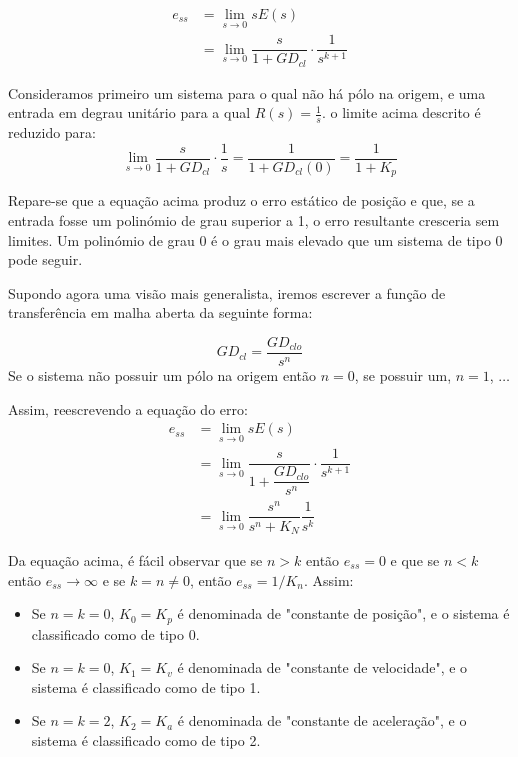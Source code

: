 $$
    \begin{aligned}
        e_{ss} &= \lim_{s \to 0} s E(s)\\
        &= \lim_{s \to 0} \dfrac{s}{1 + GD_{cl}} \cdot \dfrac{1}{s^{k + 1}}
    \end{aligned}
$$

\noindent Consideramos primeiro um sistema para o qual não há pólo na origem, e uma entrada em degrau unitário para a qual $R(s) = \frac{1}{s}$. o limite acima descrito é reduzido para:
$$
    \lim_{s \to 0} \dfrac{s}{1 + GD_{cl}} \cdot \dfrac{1}{s} = \dfrac{1}{1 + GD_{cl}(0)} = \dfrac{1}{1 + K_p}
$$

\noindent Repare-se que a equação acima produz o erro estático de posição e que, se a entrada fosse um polinómio de grau superior a 1, o erro resultante cresceria sem limites. Um polinómio de grau 0 é o grau mais elevado que um sistema de tipo 0 pode seguir.

\vspace{1 em}
\noindent Supondo agora uma visão mais generalista, iremos escrever a função de transferência em malha aberta da seguinte forma:

$$
    GD_{cl} = \dfrac{GD_{clo}}{s^n}
$$
\noindent Se o sistema não possuir um pólo na origem então $n = 0$, se possuir um, $n = 1$, $\dots$

\noindent Assim, reescrevendo a equação do erro:
$$
    \begin{aligned}
        e_{ss} &= \lim_{s \to 0} s E(s)\\
        &= \lim_{s \to 0} \dfrac{s}{1 + \dfrac{GD_{clo}}{s^n}} \cdot \dfrac{1}{s^{k + 1}}\\
        &= \lim_{s \to 0} \dfrac{s^n}{s^n + K_N}\dfrac{1}{s^k}
    \end{aligned}
$$

\noindent Da equação acima, é fácil observar que se $n > k$ então $e_{ss} = 0$ e que se $n < k$ então $e_{ss} \to \infty$ e se $k = n \neq 0$, então $e_{ss} = 1/K_n$. Assim:

\begin{itemize}
    \item Se $n = k = 0$, $K_0 = K_p$ é denominada de "constante de posição", e o sistema é classificado como de tipo 0.
    \item Se $n = k = 0$, $K_1 = K_v$ é denominada de "constante de velocidade", e o sistema é classificado como de tipo 1.
    \item Se $n = k = 2$, $K_2 = K_a$ é denominada de "constante de aceleração", e o sistema é classificado como de tipo 2.
\end{itemize}


